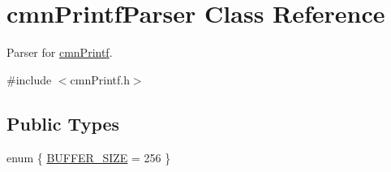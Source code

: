 \hypertarget{classcmn_printf_parser}{}\section{cmn\+Printf\+Parser Class Reference}
\label{classcmn_printf_parser}


Parser for \hyperlink{classcmn_printf}{cmn\+Printf}.  




{\ttfamily \#include $<$cmn\+Printf.\+h$>$}

\subsection*{Public Types}
\begin{DoxyCompactItemize}
\item 
enum \{ \hyperlink{group__cisst_common_gga2dbb69cb7aa030799fad9b8d7a1857d5af9f1fd3238867d902ee69418278958a9}{B\+U\+F\+F\+E\+R\+\_\+\+S\+I\+Z\+E} = 256
 \}
\end{DoxyCompactItemize}
